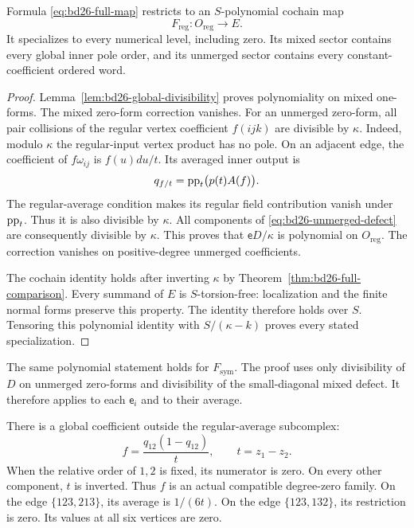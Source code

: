 \begin{theorem}\label{thm:bd26-polynomial}
Formula \eqref{eq:bd26-full-map} restricts to an $S$-polynomial cochain map
\[
 F_{\mathrm{reg}}:O_{\mathrm{reg}}\longrightarrow E.
\]
It specializes to every numerical level, including zero.
Its mixed sector contains every global inner pole order, and its unmerged sector contains every constant-coefficient ordered word.
\end{theorem}
\begin{proof}
Lemma~\ref{lem:bd26-global-divisibility} proves polynomiality on mixed one-forms.
The mixed zero-form correction vanishes.
For an unmerged zero-form, all pair collisions of the regular vertex coefficient $f(ijk)$ are divisible by $\kappa$.
Indeed, modulo $\kappa$ the regular-input vertex product has no pole.
On an adjacent edge, the coefficient of $f\omega_{ij}$ is $f(u)du/t$.
Its averaged inner output is
\[
 q_{f/t}=\operatorname{pp}_t\bigl(p(t)A(f)\bigr).
\]
The regular-average condition makes its regular field contribution vanish under $\operatorname{pp}_t$.
Thus it is also divisible by $\kappa$.
All components of \eqref{eq:bd26-unmerged-defect} are consequently divisible by $\kappa$.
This proves that $\mathsf e D/\kappa$ is polynomial on $O_{\mathrm{reg}}$.
The correction vanishes on positive-degree unmerged coefficients.

The cochain identity holds after inverting $\kappa$ by Theorem~\ref{thm:bd26-full-comparison}.
Every summand of $E$ is $S$-torsion-free: localization and the finite normal forms preserve this property.
The identity therefore holds over $S$.
Tensoring this polynomial identity with $S/(\kappa-k)$ proves every stated specialization.
\end{proof}

The same polynomial statement holds for $F_{\mathrm{sym}}$.
The proof uses only divisibility of $D$ on unmerged zero-forms and divisibility of the small-diagonal mixed defect.
It therefore applies to each $\mathsf e_i$ and to their average.

There is a global coefficient outside the regular-average subcomplex:
\[
 f=\frac{q_{12}(1-q_{12})}{t},\qquad t=z_1-z_2.
\]
When the relative order of $1,2$ is fixed, its numerator is zero.
On every other component, $t$ is inverted.
Thus $f$ is an actual compatible degree-zero family.
On the edge $\{123,213\}$, its average is $1/(6t)$.
On the edge $\{123,132\}$, its restriction is zero.
Its values at all six vertices are zero.

